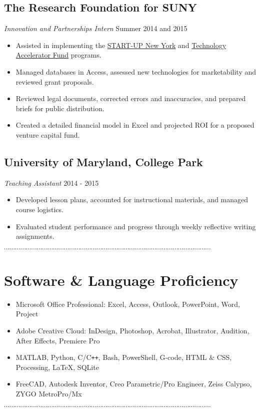 \documentclass[10pt]{article}
\newcommand{\dotfringe}{
    \begin{center}
      $\cdots\cdots\cdots\cdots\cdots\cdots\cdots\cdots\cdots\cdots\cdots\cdots\cdots\cdots\cdots\cdots\cdots\cdots\cdots\cdots\cdots\cdots\cdots\cdots\cdots\cdots\cdots\cdots\cdots\cdots\cdots\cdots\cdots\cdots\cdots\cdots\cdots\cdots$
    \end{center}
}
\begin{document}
\subsection*{The Research Foundation for SUNY}
\textit{Innovation and Partnerships Intern} \hfill Summer 2014 and 2015
\begin{itemize}
  \item Assisted in implementing the \href{https://startup.ny.gov/}{START-UP New York} and \href{https://www.rfsuny.org/Our-Work/Innovation-and-Partnerships/Programs/Technology-Accelerator-Fund/}{Technology Accelerator Fund} programs.
  \item Managed databases in Access, assessed new technologies for marketability and reviewed grant proposals.
  \item Reviewed legal documents, corrected errors and inaccuracies, and prepared briefs for public distribution.
  \item Created a detailed financial model in Excel and projected ROI for a proposed venture capital fund.
\end{itemize}
\subsection*{University of Maryland, College Park}
\textit{Teaching Assistant} \hfill 2014 - 2015
\begin{itemize}
  \item Developed lesson plans, accounted for instructional materials, and managed course logistics.
  \item Evaluated student performance and progress through weekly reflective writing assignments.
\end{itemize}
\dotfringe
\section*{Software \& Language Proficiency}
\begin{itemize}
  \item Microsoft Office Professional: Excel, Access, Outlook, PowerPoint, Word, Project
  \item Adobe Creative Cloud: InDesign, Photoshop, Acrobat, Illustrator, Audition, After Effects, Premiere Pro
  \item MATLAB, Python, C/C\texttt{++}, Bash, PowerShell, G-code, HTML \& CSS, Processing, \LaTeX, SQLite
  \item FreeCAD, Autodesk Inventor, Creo Parametric/Pro Engineer, Zeiss Calypso, ZYGO MetroPro/Mx
\end{itemize}

\dotfringe
\end{document}

